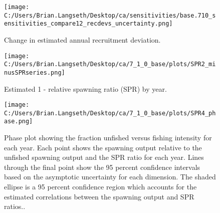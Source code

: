 \documentclass[11pt,
  english,
  a4paper,
]{article}
\begin{document}
\tagmcend\tagstructend


\begin{figure}
\centering
\texttt{[image: C:/Users/Brian.Langseth/Desktop/ca/sensitivities/base.710\_sensitivities\_compare12\_recdevs\_uncertainty.png]}
\caption{Change in estimated annual recruitment deviation.\label{fig:sens-recdev}}
\end{figure}

\tagmcend\tagstructend


\begin{figure}
\centering
\texttt{[image: C:/Users/Brian.Langseth/Desktop/ca/7\_1\_0\_base/plots/SPR2\_minusSPRseries.png]}
\caption{Estimated 1 - relative spawning ratio (SPR) by year.\label{fig:1-spr}}
\end{figure}

\tagmcend\tagstructend


\begin{figure}
\centering
\texttt{[image: C:/Users/Brian.Langseth/Desktop/ca/7\_1\_0\_base/plots/SPR4\_phase.png]}
\caption{Phase plot showing the fraction unfished versus fishing intensity for each year. Each point shows the spawning output relative to the unfished spawning output and the SPR ratio for each year. Lines through the final point show the 95 percent confidence intervals based on the asymptotic uncertainty for each dimension. The shaded ellipse is a 95 percent confidence region which accounts for the estimated correlations between the spawning output and SPR ratios..\label{fig:phase-plot}}
\end{figure}
\end{document}
